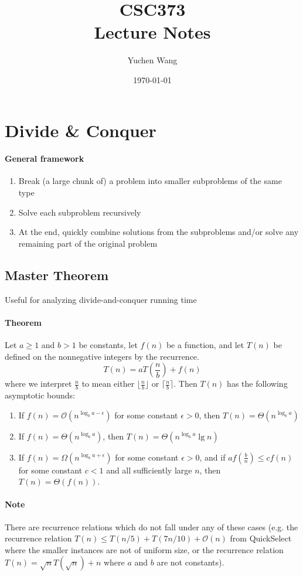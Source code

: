 \documentclass[11pt]{article}
\title{CSC373 \\ Lecture Notes}
\author{Yuchen Wang}
\date{\today}
\begin{document}
    \maketitle
    \tableofcontents
    \newpage
\section{Divide \& Conquer}
\paragraph{General framework}
\begin{enumerate}
	\item Break (a large chunk of) a problem into smaller subproblems of the same type
	\item Solve each subproblem recursively
	\item At the end, quickly combine solutions from the subproblems and/or solve any remaining part of the original problem
\end{enumerate}
\subsection{Master Theorem}
Useful for analyzing divide-and-conquer running time
\paragraph{Theorem}
Let $a \geq 1$ and $b > 1$ be constants, let $f(n)$ be a function, and let $	T(n)$ be defined on the nonnegative integers by the recurrence.
$$T(n) = aT(\frac{n}{b}) + f(n)$$
where we interpret $\frac{n}{b}$ to mean either $\lfloor \frac{n}{b} \rfloor$ or $\lceil \frac{n}{b} \rceil$. Then $T(n)$ has the following asymptotic bounds:
\begin{enumerate}
	\item If $f(n) = \mathcal{O}(n^{\log_b{a-\epsilon}})$ for some constant $\epsilon > 0$, then $T(n) = \Theta(n^{\log_b a})$
	\item If $f(n) = \Theta(n^{\log_b a})$, then $T(n) = \Theta(n^{\log_b a} \lg n)$
	\item If $f(n) = \Omega(n^{\log_b{a+\epsilon}})$ for some constant $\epsilon > 0$, and if $af(\frac{b}{n}) \leq cf(n)$ for some constant $c < 1$ and all sufficiently large $n$, then $T(n) = \Theta(f(n))$.	
\end{enumerate}

\paragraph{Note}
There are recurrence relations which do not fall under any of these cases (e.g. the recurrence relation $T(n) \leq T(n/5) + T(7n/10) + \mathcal{O}(n)$ from QuickSelect where the smaller instances are not of uniform size, or the recurrence relation $T(n) = \sqrt{n}T(\sqrt{n}) + n$ where $a$ and $b$ are not constants).
\end{document}
